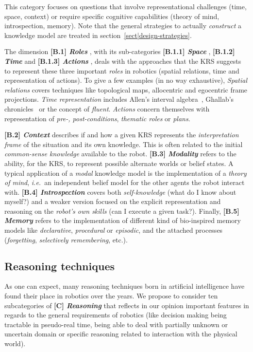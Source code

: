 \documentclass{IEEEtran}
\newcommand{\ie}{{\textit{i.e.\ }}}
\newcommand{\taxon}[2]{%
    \textbf{[#1] \emph{#2}}
}
\begin{document}
This category focuses on questions that involve
representational challenges (time, space, context) or require specific
cognitive capabilities (theory of mind, introspection, memory).
Note that the general strategies to actually \emph{construct} a
knowledge model are treated in section~\ref{sect|design-strategies}.

The dimension \taxon{B.1}{Roles}, with its sub-categories \taxon{B.1.1}{Space},
\taxon{B.1.2}{Time} and \taxon{B.1.3}{Actions}, deals with the approaches that
the KRS suggests to represent these three important \emph{roles} in robotics
(spatial relations, time and representation of actions). To give a few examples
(in no way exhaustive), \emph{Spatial relations} covers techniques like
topological maps, allocentric and egocentric frame projections. \emph{Time
representation} includes Allen's interval algebra~\cite{Allen1984}, Ghallab's
chronicles~\cite{Ghallab1996} or the concept of \emph{fluent}. \emph{Actions}
concern themselves with representation of \emph{pre-, post-conditions},
\emph{thematic roles} or \emph{plans}.

\taxon{B.2}{Context} describes if and how a given KRS represents the
\emph{interpretation frame} of the situation and its own knowledge. This is
often related to the initial \emph{common-sense knowledge} available to the
robot. \taxon{B.3}{Modality} refers to the ability, for the KRS, to represent
possible alternate worlds or belief states. A typical application of a
\emph{modal} knowledge model is the implementation of a \emph{theory of mind},
\ie an independent belief model for the other agents the robot interact with.
\taxon{B.4}{Introspection} covers both \emph{self-knowledge} (what do I know
about myself?) and a weaker version focused on the explicit representation and
reasoning on the \emph{robot's own skills} (can I execute a given task?).
Finally, \taxon{B.5}{Memory} refers to the implementation of
different kind of bio-inspired memory models like \emph{declarative},
\emph{procedural} or \emph{episodic}, and the attached processes
(\emph{forgetting}, \emph{selectively remembering}, etc.).

\subsection{Reasoning techniques}
\label{sect|reasoning}

As one can expect, many reasoning techniques born in artificial intelligence
have found their place in robotics over the years. We propose to consider ten
subcategories of \taxon{C}{Reasoning} that reflects in our opinion important
features in regards to the general requirements of robotics (like decision
making being tractable in pseudo-real time, being able to deal with partially
unknown or uncertain domain or specific reasoning related to interaction with
the physical world).
\end{document}
